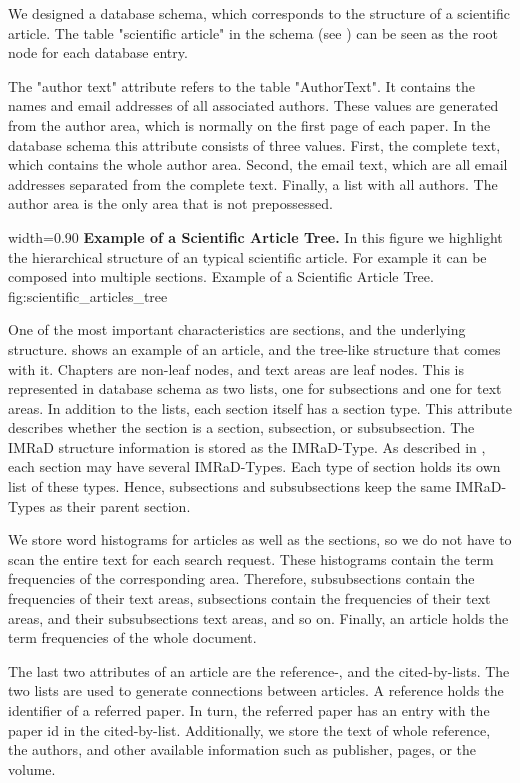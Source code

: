 We designed a database schema, which corresponds to the structure of a scientific article. The table "scientific article" in the schema (see ) can be seen as the root node for each database entry.

The "author text" attribute refers to the table "AuthorText". It contains the names and email addresses of all associated authors. These values are generated from the author area, which is normally on the first page of each paper. In the database schema this attribute consists of three values. First, the complete text, which contains the whole author area. Second, the email text, which are all email addresses separated from the complete text. Finally, a list with all authors. The author area is the only area that is not prepossessed.

      {width=0.90\textwidth}
      {\textbf{Example of a Scientific Article Tree.} In this figure we highlight the hierarchical structure of an typical scientific article. For example it can be composed into multiple sections.}
      {Example of a Scientific Article Tree.}
      {fig:scientific_articles_tree}

One of the most important characteristics are sections, and the underlying structure.  shows an example of an article, and the tree-like structure that comes with it. Chapters are non-leaf nodes, and text areas are leaf nodes. This is represented in database schema as two lists, one for subsections and one for text areas. In addition to the lists, each section itself has a section type. This attribute describes whether the section is a section, subsection, or subsubsection. The IMRaD structure information is stored as the IMRaD-Type. As described in , each section may have several IMRaD-Types. Each type of section holds its own list of these types. Hence, subsections and subsubsections keep the same IMRaD-Types as their parent section.

We store word histograms for articles as well as the sections, so we do not have to scan the entire text for each search request. These histograms contain the term frequencies of the corresponding area. Therefore, subsubsections contain the frequencies of their text areas, subsections contain the frequencies of their text areas, and their subsubsections text areas, and so on. Finally, an article holds the term frequencies of the whole document.

The last two attributes of an article are the reference-, and the cited-by-lists. The two lists are used to generate connections between articles. A reference holds the identifier of a referred paper. In turn, the referred paper has an entry with the paper id in the cited-by-list. Additionally, we store the text of whole reference, the authors, and other available information such as publisher, pages, or the volume.

